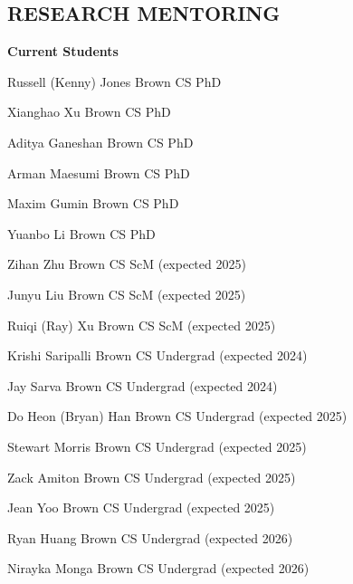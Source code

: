\documentclass[line,margin]{res}
\begin{document}
\begin{resume}

\section{RESEARCH MENTORING}

\newcommand{\currentphd}[2] {
	#1 \hfill #2
}

\newcommand{\student}[3] {
	#1 \hfill #2 (expected #3)
}

\newcommand{\alumni}[4] {
	#1 \hfill #2 #3\\
	\emph{Next position: #4}
}

\newcommand{\visitor}[4] {
	#1 \hfill #2 #3\\
	\emph{Home institution: #4}
}

\newcommand{\thesiscomm}[3] {
	#1 \hfill #2\\
	\emph{#3}
}


\textbf{Current Students}

\currentphd
{Russell (Kenny) Jones}
{Brown CS PhD}

\currentphd
{Xianghao Xu}
{Brown CS PhD}

\currentphd
{Aditya Ganeshan}
{Brown CS PhD}

\currentphd
{Arman Maesumi}
{Brown CS PhD}

\currentphd
{Maxim Gumin}
{Brown CS PhD}

\currentphd
{Yuanbo Li}
{Brown CS PhD}

\student
{Zihan Zhu}
{Brown CS ScM}
{2025}

\student
{Junyu Liu}
{Brown CS ScM}
{2025}

\student
{Ruiqi (Ray) Xu}
{Brown CS ScM}
{2025}

\student
{Krishi Saripalli}
{Brown CS Undergrad}
{2024}

\student
{Jay Sarva}
{Brown CS Undergrad}
{2024}

\student
{Do Heon (Bryan) Han}
{Brown CS Undergrad}
{2025}

\student
{Stewart Morris}
{Brown CS Undergrad}
{2025}

\student
{Zack Amiton}
{Brown CS Undergrad}
{2025}

\student
{Jean Yoo}
{Brown CS Undergrad}
{2025}

\student
{Ryan Huang}
{Brown CS Undergrad}
{2026}

\student
{Nirayka Monga}
{Brown CS Undergrad}
{2026}


\end{resume}
\end{document}
